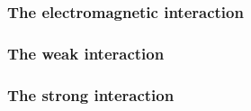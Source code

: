 \subsubsection{The electromagnetic interaction} \label{sec:EMInteraction}


\subsubsection{The weak interaction} \label{sec:WeakInteraction}


\subsubsection{The strong interaction} \label{sec:StrongInteraction}


